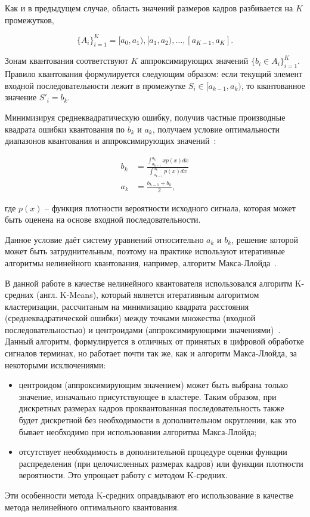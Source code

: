 Как и в предыдущем случае, область значений размеров кадров
разбивается на $K$ промежутков,

\begin{equation}
    \{A_i\} _{i=1}^K = {[a_0, a_1), [a_1, a_2), \dots, [a_{K-1}, a_K]}.
\end{equation}

Зонам квантования соответствуют $K$ аппроксимирующих значений
$\{b_i \in A_i\} _{i=1}^K$. Правило квантования формулируется следующим
образом: если текущий элемент входной последовательности
лежит в промежутке $S_i \in [a_{k-1}, a_k)$, то квантованное
значение $S'_i = b_k$.

Минимизируя среднеквадратическую ошибку, получив частные
производные квадрата ошибки квантования по $b_k$ и $a_k$, получаем
условие оптимальности диапазонов квантования и аппроксимирующих
значений~\cite{digitalSignalProcessing}:

\begin{equation}
    \begin{aligned}
        b_k &= \frac{\int_{a_{k-1}}^{a_k} x p(x) dx}{\int_{a_{k-1}}^{a_k} p(x) dx} \\
        a_k &= \frac{b_{k-1} + b_k}{2},
    \end{aligned}
\end{equation}

где $p(x)$ -- функция плотности вероятности исходного сигнала,
которая может быть оценена на основе входной последовательности.

Данное условие даёт систему уравнений относительно $a_k$ и $b_k$,
решение которой может быть затруднительным, поэтому на практике
используют итеративные алгоритмы нелинейного квантования, например,
алгоритм Макса-Ллойда~\cite{lloydmax}.

В данной работе в качестве нелинейного квантователя использовался
алгоритм K-средних (англ. K-Means),
который является итеративным алгоритмом кластеризации,
рассчитаным на минимизацию квадрата расстояния (среднеквадратической ошибки)
между точками множества (входной последовательностью) и центроидами
(аппроксимирующими значениями)~\cite{kmeans}. Данный алгоритм,
формулируется в отличных от принятых в цифровой обработке
сигналов терминах, но работает почти так же, как и алгоритм
Макса-Ллойда, за некоторыми исключениями:

\begin{itemize}
    \item центроидом (аппроксимирующим значением) может быть выбрана
        только значение, изначально присутствующее в кластере.
        Таким образом, при дискретных размерах кадров проквантованная
        последовательность также будет дискретной без необходимости
        в дополнительном округлении, как это бывает необходимо при
        использовании алгоритма Макса-Ллойда;
    \item отсутствует необходимость в дополнительной процедуре оценки
        функции распределения (при целочисленных размерах кадров)
        или функции плотности вероятности. Это упрощает работу
        с методом K-средних.
\end{itemize}

\hspace{8pt}

Эти особенности метода K-средних оправдывают его использование в
качестве метода нелинейного оптимального квантования.
